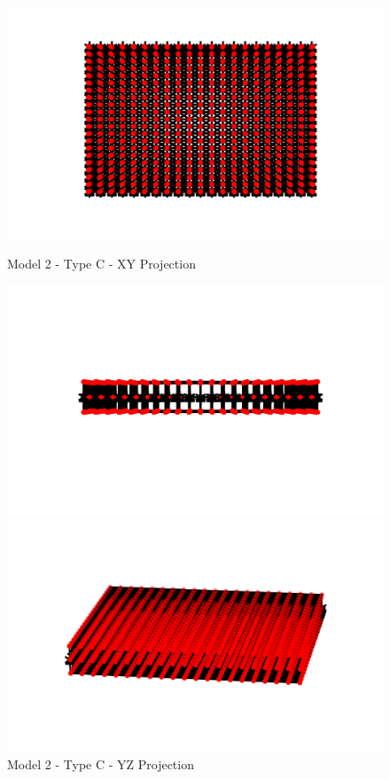 \begin{figure}[!htbp]
\begin{minipage}{0.3\textwidth}
    \centering
    \includegraphics[width = 1\textwidth]{Figures/M2_type_c_XY.png}
    \caption{Model 2 - Type C - XY Projection}
    \label{fig:M2_c_XY}
\end{minipage}
\hspace{5mm}
\begin{minipage}{0.3\textwidth}
    \centering
    \includegraphics[width = 1\textwidth]{Figures/M2_type_c_YZ.png}
    \caption{Model 2 - Type C - YZ Projection}
    \label{fig:M2_c_YZ}
\end{minipage}
\hspace{5mm}
\begin{minipage}{0.3\textwidth}
    \centering
    \includegraphics[width = 1\textwidth]{Figures/M2_type_c_3D.png}

\end{minipage}
\end{figure}
